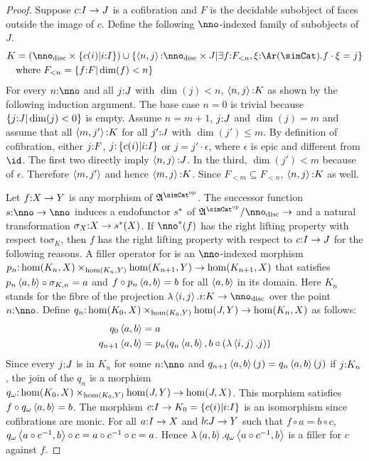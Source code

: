 \documentclass[csh.tex]{subfiles}
\begin{document}
\begin{proof}
Suppose $c\mathord : I\to J$ is a cofibration and $F$ is the decidable subobject of faces outside the image of $c$.
Define the following $\nno$-indexed family of subobjects of $J$.
\begin{align*} 
K &= (\nno\disc\times \set{c(i)| i\of I})\cup\set{ \tuplet{n,j}\of \nno\disc\times J \middle| \exists f\of F_{<n}, \xi\of\Ar(\simCat).f\cdot \xi = j }\\
&\textrm{where } F_{<n} = \set{f\of F|\dim(f) < n}
\end{align*}
For every $n\of \nno$ and all $j\mathord : J$ with $\dim(j) < n$, $\left\langle n,j \right\rangle\mathord : K$ as shown by the following induction argument. The base case $n=0$ is trivial because $\left\{j\mathord : J|\dim(j)<0\right\}$ is empty. Assume $n = m+1$, $j\mathord : J$ and $\dim(j)=m$ and assume that all $\left\langle m,j' \right\rangle\mathord : K$ for all $j'\mathord : J$ with $\dim(j') \leq m$. By definition of cofibration, either $j\mathord : F$, $j\mathord : \left\{c(i)|i\mathord : I\right\}$ or $j=j'\cdot\epsilon$, where $\epsilon$ is epic and different from $\id$. The first two directly imply $\left\langle n,j \right\rangle\mathord : J$. In the third, $\dim(j') < m$ because of $\epsilon$. Therefore $\left\langle m,j' \right\rangle$ and hence $\left\langle m,j \right\rangle\mathord : K$. Since $F_{<m}\subseteq F_{<n}$, $\left\langle n,j \right\rangle\mathord : K$ as well.

Let $f\mathord : X\to Y$ is any morphism of $\ambient\s$. The successor function $s\of \nno\to\nno$ induces a endofunctor $s^*$ of $\ambient\s/\nno\disc\to$ and a natural transformation $\sigma_X\mathord : X \to s^*(X)$. If $\nno\ri(f)$ has the right lifting property with respect to$\sigma_K$, then $f$ has the right lifting property with respect to $c\mathord : I\to J$ for the following reasons. A filler operator for is an $\nno$-indexed morphism 
$p_n \mathord : \hom(K_n,X)\times_{\hom(K_n,Y)}\hom(K_{n+1},Y) \to \hom(K_{n+1},X)$ that satisfies
$p_n\left\langle a,b \right\rangle\circ \sigma_{K,n} = a$ and $f\circ p_n\left\langle a,b \right\rangle = b$ for all $\left\langle a,b \right\rangle$ in its domain.
Here $K_n$ stands for the fibre of the projection $\function{\tuplet{i,j}}i\of K\to\nno\disc$ over the point $n\of \nno$.
Define $q_n\mathord :\hom(K_0,X)\times_{\hom(K_0,Y)}\hom(J,Y)\to \hom(K_n,X)$ as follows:
\begin{align*}
q_0\left\langle a,b \right\rangle &= a\\
q_{n+1}\left\langle a,b \right\rangle &= p_n(q_n\left\langle a,b \right\rangle,b\circ (\lambda \left\langle i,j \right\rangle .j))
\end{align*}
Since every $j\mathord : J$ is in $K_n$ for some $n\of\nno$ and $q_{n+1}\left\langle a,b \right\rangle(j) = q_n\left\langle a,b \right\rangle(j)$ if $j\mathord : K_n$, the join of the $q_n$ is a morphism $q_\omega\mathord :\hom(K_0,X)\times_{\hom(K_0,Y)}\hom(J,Y)\to \hom(J,X)$. This morphism satisfies $f\circ q_\omega\left\langle a,b \right\rangle = b$.
The morphism $c\mathord : I \to K_0 = \left\{c(i)|i\mathord : I\right\}$ is an isomorphism since cofibrations are monic. For all $a\mathord : I\to X$ and $b\mathord : J\to Y$ such that $f\circ a = b\circ c$, $q_\omega\left\langle a\circ c^{-1},b \right\rangle\circ c = a\circ c^{-1}\circ c = a$. Hence $\lambda \left\langle a,b \right\rangle .q_\omega\left\langle a\circ c^{-1},b \right\rangle$ is a filler for $c$ against $f$.


\end{proof}
\end{document}
